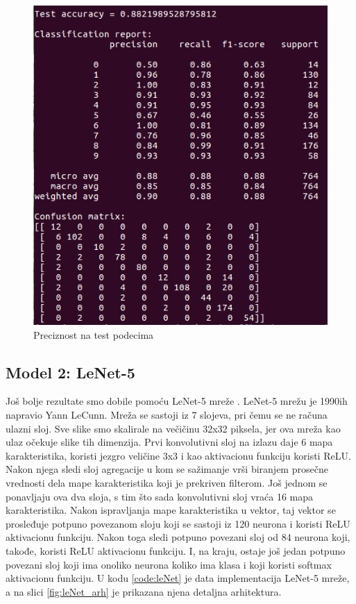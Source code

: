 \documentclass[a4paper]{article}
\begin{document}
\begin{figure}[h!]
\begin{center}
\includegraphics[scale=0.45]{model1_test_acc.png}
\end{center}
\caption{Preciznost na test podecima}
\label{fig:model1_test_acc}
\end{figure}

\newpage

\subsection{Model 2:  LeNet-5}
\label{sec:model_2}


Još bolje rezultate smo dobile pomoću LeNet-5 mreže \cite{leNet}. LeNet-5 mrežu je 1990ih napravio Yann LeCunn. Mreža se sastoji iz 7 slojeva, pri čemu se ne računa ulazni sloj. Sve slike smo skalirale na večičinu 32x32 piksela, jer ova mreža kao ulaz očekuje slike tih dimenzija. Prvi konvolutivni sloj na izlazu daje 6 mapa karakteristika, koristi jezgro veličine 3x3 i kao aktivacionu funkciju koristi ReLU. Nakon njega sledi sloj agregacije u kom se sažimanje vrši biranjem prosečne vrednosti dela mape karakteristika koji je prekriven filterom. 
Još jednom se ponavljaju ova dva sloja, s tim što sada konvolutivni sloj vraća 16 mapa karakteristika. Nakon ispravljanja mape karakteristika u vektor, taj vektor se prosleđuje potpuno povezanom sloju koji se sastoji iz 120 neurona i koristi ReLU aktivacionu funkciju. Nakon toga sledi potpuno povezani sloj od 84 neurona koji, takođe, koristi ReLU aktivacionu funkciju. I, na kraju, ostaje još jedan potpuno povezani sloj koji ima onoliko neurona koliko ima klasa i koji koristi softmax aktivacionu funkciju. U kodu \ref{code:leNet} je data implementacija LeNet-5 mreže, a na slici \ref{fig:leNet_arh} je prikazana njena detaljna arhitektura.
\end{document}
